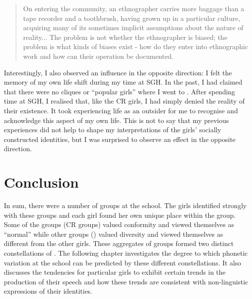 \begin{quote}
	On entering the community, an ethnographer carries more baggage than a tape recorder and a toothbrush, having grown up in a particular culture, acquiring many of its sometimes implicit assumptions about the nature of reality... The problem is not whether the ethnographer is biased; the problem is what kinds of biases exist - how do they enter into ethnographic work and how can their operation be documented. \citep[41-2]{agar1980}
\end{quote}

\noindent Interestingly, I also observed an influence in the opposite direction: I felt the memory of my own  life shift during my time at SGH. In the past, I had claimed that there were no cliques or ``popular girls'' where I went to . After spending time at SGH, I realised that, like the CR girls, I had simply denied the reality of their existence. It took experiencing  life as an outsider for me to recognise and acknowledge this aspect of my own  life. This is not to say that my previous experiences did not help to shape my interpretations of the girls' socially constructed identities, but I was surprised to observe an effect in the opposite direction.

\section{Conclusion}

In sum, there were a number of groups at the school. The girls identified strongly with these groups and each girl found her own unique place within the group. Some of the groups (CR groups) valued conformity and viewed themselves as ``normal'' while other groups () valued diversity and viewed themselves as different from the other girls. These aggregates of groups formed two distinct constellations of . The following chapter investigates the degree to which phonetic variation at the school can be predicted by these different constellations. It also discusses the tendencies for particular girls to exhibit certain trends in the production of their speech and how these trends are consistent with non-linguistic expressions of their identities.


\newpage
\thispagestyle{empty}
\mbox{}